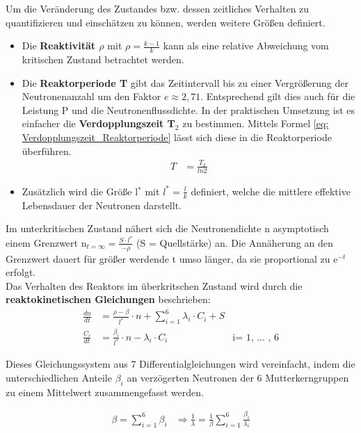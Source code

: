 	
	Um die Veränderung des Zustandes bzw. dessen zeitliches Verhalten zu quantifizieren und einschätzen zu können, werden weitere Größen definiert.
	\begin{itemize}
	\item Die \textbf{Reaktivität $\rho$} mit $\rho=\frac{k-1}{k}$ kann als eine relative Abweichung vom kritischen Zustand betrachtet werden.
	\item Die \textbf{Reaktorperiode T} gibt das Zeitintervall bis zu einer Vergrößerung der Neutronenanzahl um den Faktor $e\approx 2,71$. Entsprechend gilt dies auch für die Leistung P und die Neutronenflussdichte. In der praktischen Umsetzung ist es einfacher die \textbf{Verdopplungszeit T$_{2}$} zu bestimmen. Mittels Formel \ref{eq: Verdopplungszeit_Reaktorperiode} lässt sich diese in die Reaktorperiode überführen.
	\begin{align}
	T&=\frac{T_{2}}{ln2} \label{eq: Verdopplungszeit_Reaktorperiode}
	\end{align}
	
	\item Zusätzlich wird die Größe l$ ^{*} $ mit $l^{*}=\frac{l}{k}$ definiert, welche die mittlere effektive Lebensdauer der Neutronen darstellt.
	\end{itemize}
	
	Im unterkritischen Zustand nähert sich die Neutronendichte n asymptotisch einem Grenzwert n$ _{t=\infty} = \frac{S\cdot l^{*}}{- \rho}$ (S = Quellstärke) an. Die Annäherung an den Grenzwert dauert für größer werdende t umso länger, da sie proportional zu e$ ^{-t} $ erfolgt.\\
	Das Verhalten des Reaktors im überkritschen Zustand wird durch die \textbf{reaktokinetischen Gleichungen} beschrieben:
	\begin{align}
	\frac{dn}{dt}&= \frac{\rho - \beta}{l^{*}}\cdot n + \sum \limits^{6}_{i=1} \lambda_{i}\cdot C_{i} + S\\
	\frac{C_{i}}{dt}&= \frac{\beta _{i}}{l^{*}} \cdot n - \lambda _{i} \cdot C_{i}
	& \text{i= 1, ... , 6}
	\end{align}
	
	Dieses Gleichungssystem aus 7 Differentialgleichungen wird vereinfacht, indem die unterschiedlichen Anteile $\beta _{i}$ an verzögerten Neutronen der 6 Mutterkerngruppen zu einem Mittelwert zusammengefasst werden.
	
	\begin{align}
	\beta= \sum \limits^{6}_{i=1} \beta _{i} &\Rightarrow \frac{1}{\lambda} = \frac{1}{\beta} \sum \limits^{6}_{i=1} \frac{\beta_{i}}{\lambda _{i}}
	\end{align}
	
